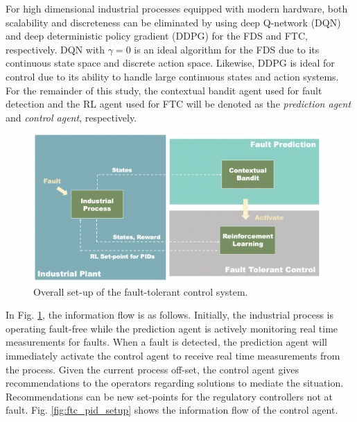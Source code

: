 For high dimensional industrial processes equipped with modern hardware, both scalability and discreteness can be eliminated by using deep Q-network (DQN) and deep deterministic policy gradient (DDPG) for the FDS and FTC, respectively.  DQN with $\gamma = 0$ is an ideal algorithm for the FDS due to its continuous state space and discrete action space. Likewise, DDPG is ideal for control due to its ability to handle large continuous states and action systems. For the remainder of this study, the contextual bandit agent used for fault detection and the RL agent used for FTC will be denoted as the \textit{prediction agent} and \textit{control agent}, respectively.

\begin{figure}[h]
    \begin{center}
        \includegraphics[width=11cm]{images/ftc/FTC_Setup.png}
        \caption{\label{fig:ftc_setup} Overall set-up of the fault-tolerant control system.}
    \end{center}
\end{figure}
In Fig. \ref{fig:ftc_setup}, the information flow is as follows.  Initially, the industrial process is operating fault-free while the prediction agent is actively monitoring real time measurements for faults.  When a fault is detected, the prediction agent will immediately activate the control agent to receive real time measurements from the process.  Given the current process off-set, the control agent gives recommendations to the operators regarding solutions to mediate the situation.  Recommendations can be new set-points for the regulatory controllers not at fault.
Fig. \ref{fig:ftc_pid_setup} shows the information flow of the control agent. 
